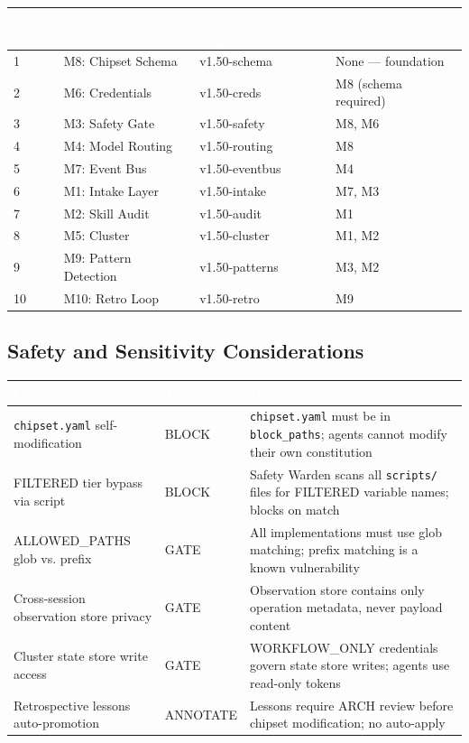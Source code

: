 \documentclass[11pt,letterpaper]{article}
\newcommand{\tableheader}[1]{\textbf{\sffamily\textcolor{white}{#1}}}
\begin{document}
\begin{center}
\begin{tabularx}{\textwidth}{C{1cm}L{3cm}L{3cm}X}
\toprule
{}
\tableheader{Order} & \tableheader{Module} & \tableheader{GSD Milestone Tag} & \tableheader{Dependency} \\
 & M8: Chipset Schema & v1.50-schema & None --- foundation \\
2 & M6: Credentials & v1.50-creds & M8 (schema required) \\
3 & M3: Safety Gate & v1.50-safety & M8, M6 \\
4 & M4: Model Routing & v1.50-routing & M8 \\
5 & M7: Event Bus & v1.50-eventbus & M4 \\
6 & M1: Intake Layer & v1.50-intake & M7, M3 \\
7 & M2: Skill Audit & v1.50-audit & M1 \\
8 & M5: Cluster & v1.50-cluster & M1, M2 \\
9 & M9: Pattern Detection & v1.50-patterns & M3, M2 \\
10 & M10: Retro Loop & v1.50-retro & M9 \\
\end{tabularx}
\end{center}

\subsection{Safety and Sensitivity Considerations}

\begin{center}
\begin{tabularx}{\textwidth}{L{3cm}L{2cm}X}
\toprule
{}
\tableheader{Consideration} & \tableheader{Type} & \tableheader{Handling} \\
\midrule
\texttt{chipset.yaml} self-modification & BLOCK & \texttt{chipset.yaml} must be in \texttt{block\_paths}; agents cannot modify their own constitution \\
FILTERED tier bypass via script & BLOCK & Safety Warden scans all \texttt{scripts/} files for FILTERED variable names; blocks on match \\
ALLOWED\_PATHS glob vs. prefix & GATE & All implementations must use glob matching; prefix matching is a known vulnerability \\
Cross-session observation store privacy & GATE & Observation store contains only operation metadata, never payload content \\
Cluster state store write access & GATE & WORKFLOW\_ONLY credentials govern state store writes; agents use read-only tokens \\
Retrospective lessons auto-promotion & ANNOTATE & Lessons require ARCH review before chipset modification; no auto-apply \\
\end{tabularx}
\end{center}
\end{document}
